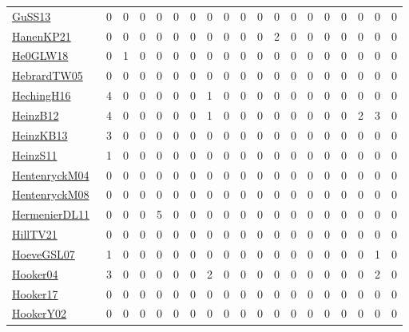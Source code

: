 {\begin{longtable}{l*{18}{r}}
\href{papers/GuSS13.pdf}{GuSS13}~\cite{GuSS13} & 0 & 0 & 0 & 0 & 0 & 0 & 0 & 0 & 0 & 0 & 0 & 0 & 0 & 0 & 0 & 0 & 0 & 0\\
\href{papers/HanenKP21.pdf}{HanenKP21}~\cite{HanenKP21} & 0 & 0 & 0 & 0 & 0 & 0 & 0 & 0 & 0 & 0 & 2 & 0 & 0 & 0 & 0 & 0 & 0 & 0\\
\href{papers/He0GLW18.pdf}{He0GLW18}~\cite{He0GLW18} & 0 & 1 & 0 & 0 & 0 & 0 & 0 & 0 & 0 & 0 & 0 & 0 & 0 & 0 & 0 & 0 & 0 & 0\\
\href{papers/HebrardTW05.pdf}{HebrardTW05}~\cite{HebrardTW05} & 0 & 0 & 0 & 0 & 0 & 0 & 0 & 0 & 0 & 0 & 0 & 0 & 0 & 0 & 0 & 0 & 0 & 0\\
\href{papers/HechingH16.pdf}{HechingH16}~\cite{HechingH16} & 4 & 0 & 0 & 0 & 0 & 0 & 1 & 0 & 0 & 0 & 0 & 0 & 0 & 0 & 0 & 0 & 0 & 0\\
\href{papers/HeinzB12.pdf}{HeinzB12}~\cite{HeinzB12} & 4 & 0 & 0 & 0 & 0 & 0 & 1 & 0 & 0 & 0 & 0 & 0 & 0 & 0 & 0 & 2 & 3 & 0\\
\href{papers/HeinzKB13.pdf}{HeinzKB13}~\cite{HeinzKB13} & 3 & 0 & 0 & 0 & 0 & 0 & 0 & 0 & 0 & 0 & 0 & 0 & 0 & 0 & 0 & 0 & 0 & 0\\
\href{papers/HeinzS11.pdf}{HeinzS11}~\cite{HeinzS11} & 1 & 0 & 0 & 0 & 0 & 0 & 0 & 0 & 0 & 0 & 0 & 0 & 0 & 0 & 0 & 0 & 0 & 0\\
\href{papers/HentenryckM04.pdf}{HentenryckM04}~\cite{HentenryckM04} & 0 & 0 & 0 & 0 & 0 & 0 & 0 & 0 & 0 & 0 & 0 & 0 & 0 & 0 & 0 & 0 & 0 & 0\\
\href{papers/HentenryckM08.pdf}{HentenryckM08}~\cite{HentenryckM08} & 0 & 0 & 0 & 0 & 0 & 0 & 0 & 0 & 0 & 0 & 0 & 0 & 0 & 0 & 0 & 0 & 0 & 0\\
\href{papers/HermenierDL11.pdf}{HermenierDL11}~\cite{HermenierDL11} & 0 & 0 & 0 & 5 & 0 & 0 & 0 & 0 & 0 & 0 & 0 & 0 & 0 & 0 & 0 & 0 & 0 & 0\\
\href{papers/HillTV21.pdf}{HillTV21}~\cite{HillTV21} & 0 & 0 & 0 & 0 & 0 & 0 & 0 & 0 & 0 & 0 & 0 & 0 & 0 & 0 & 0 & 0 & 0 & 0\\
\href{papers/HoeveGSL07.pdf}{HoeveGSL07}~\cite{HoeveGSL07} & 1 & 0 & 0 & 0 & 0 & 0 & 0 & 0 & 0 & 0 & 0 & 0 & 0 & 0 & 0 & 0 & 1 & 0\\
\href{papers/Hooker04.pdf}{Hooker04}~\cite{Hooker04} & 3 & 0 & 0 & 0 & 0 & 0 & 2 & 0 & 0 & 0 & 0 & 0 & 0 & 0 & 0 & 0 & 2 & 0\\
\href{papers/Hooker17.pdf}{Hooker17}~\cite{Hooker17} & 0 & 0 & 0 & 0 & 0 & 0 & 0 & 0 & 0 & 0 & 0 & 0 & 0 & 0 & 0 & 0 & 0 & 0\\
\href{papers/HookerY02.pdf}{HookerY02}~\cite{HookerY02} & 0 & 0 & 0 & 0 & 0 & 0 & 0 & 0 & 0 & 0 & 0 & 0 & 0 & 0 & 0 & 0 & 0 & 0\\

\end{longtable}}
